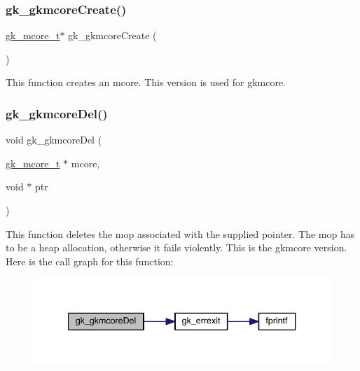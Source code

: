 \subsubsection{\texorpdfstring{gk\+\_\+gkmcore\+Create()}{gk\_gkmcoreCreate()}}
{\footnotesize\ttfamily \hyperlink{a00682}{gk\+\_\+mcore\+\_\+t}$\ast$ gk\+\_\+gkmcore\+Create (\begin{DoxyParamCaption}{ }\end{DoxyParamCaption})}

This function creates an mcore. This version is used for gkmcore. \mbox{\label{a00077_a6b0166aa10e35fb252f8561cac8f3bbb}} 
\subsubsection{\texorpdfstring{gk\+\_\+gkmcore\+Del()}{gk\_gkmcoreDel()}}
{\footnotesize\ttfamily void gk\+\_\+gkmcore\+Del (\begin{DoxyParamCaption}\item[{\hyperlink{a00682}{gk\+\_\+mcore\+\_\+t} $\ast$}]{mcore,  }\item[{void $\ast$}]{ptr }\end{DoxyParamCaption})}

This function deletes the mop associated with the supplied pointer. The mop has to be a heap allocation, otherwise it fails violently. This is the gkmcore version. Here is the call graph for this function\+:\nopagebreak
\begin{figure}[H]
\begin{center}
\leavevmode
\includegraphics[width=340pt]{a00077_a6b0166aa10e35fb252f8561cac8f3bbb_cgraph}
\end{center}
\end{figure}
\mbox{\label{a00077_af01302d6237a06da732bba561ed53538}} 
